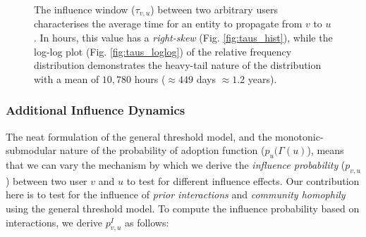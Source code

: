 \documentclass[journal,10pt,draftclsnofoot,onecolumn]{IEEEtran}
\begin{document}
\begin{figure}[ht!]
  \begin{center}
  \end{center}    
  \caption{The influence window ($\tau_{v,u}$) between two arbitrary users characterises the average time for an entity to propagate from $v$ to $u$. In hours, this value has a \emph{right-skew} (Fig. \ref{fig:taus_hist}), while the log-log plot (Fig. \ref{fig:taus_loglog}) of the relative frequency distribution demonstrates the heavy-tail nature of the distribution with a mean of $10,780$ hours ($\approx 449$ days $\approx 1.2$ years).}
  \label{fig:taus}
\end{figure}

\subsubsection{Additional Influence Dynamics}
The neat formulation of the general threshold model, and the monotonic-submodular nature of the probability of adoption function ($p_u(\Gamma(u)$), means that we can vary the mechanism by which we derive the \emph{influence probability} ($p_{v,u}$) between two user $v$ and $u$ to test for different influence effects.
Our contribution here is to test for the influence of \emph{prior interactions} and \emph{community homophily} using the general threshold model.
To compute the influence probability based on interactions, we derive $p^I_{v,u}$ as follows:
\end{document}
